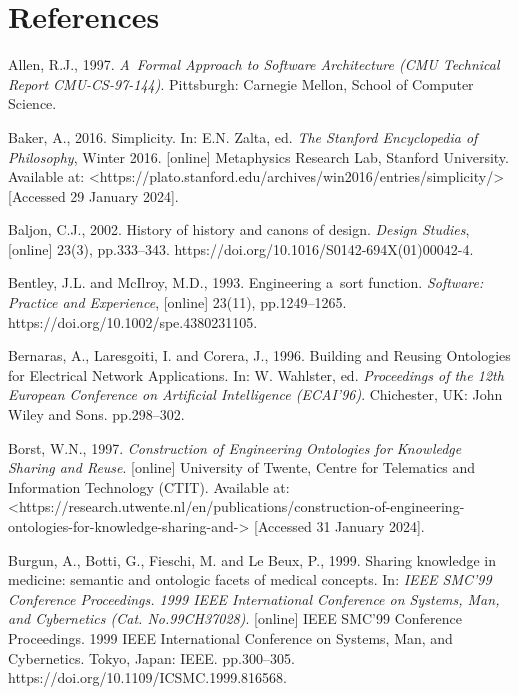 \section{References}

Allen, R.J., 1997. \textit{A~Formal Approach to Software Architecture (CMU Technical Report CMU-CS-97-144)}. Pittsburgh: Carnegie Mellon, School of Computer Science.



Baker, A., 2016. Simplicity. In: E.N. Zalta, ed. \textit{The Stanford Encyclopedia of Philosophy}, Winter 2016. [online] Metaphysics Research Lab, Stanford University. Available at: {\textless}https://plato.stanford.edu/archives/win2016/entries/simplicity/{\textgreater} [Accessed 29 January 2024].



Baljon, C.J., 2002. History of history and canons of design. \textit{Design Studies}, [online] 23(3), pp.333–343. https://doi.org/10.1016/S0142-694X(01)00042-4.



Bentley, J.L. and McIlroy, M.D., 1993. Engineering a~sort function. \textit{Software: Practice and Experience}, [online] 23(11), pp.1249–1265. https://doi.org/10.1002/spe.4380231105.



Bernaras, A., Laresgoiti, I. and Corera, J., 1996. Building and Reusing Ontologies for Electrical Network Applications. In: W. Wahlster, ed. \textit{Proceedings of the 12th European Conference on Artificial Intelligence (ECAI'96)}. Chichester, UK: John Wiley and Sons. pp.298–302.



Borst, W.N., 1997. \textit{Construction of Engineering Ontologies for Knowledge Sharing and Reuse}. [online] University of Twente, Centre for Telematics and Information Technology (CTIT). Available at: {\textless}https://research.utwente.nl/en/publications/construction-of-engineering-ontologies-for-knowledge-sharing-and-{\textgreater} [Accessed 31 January 2024].



Burgun, A., Botti, G., Fieschi, M. and Le Beux, P., 1999. Sharing knowledge in medicine: semantic and ontologic facets of medical concepts. In: \textit{IEEE SMC'99 Conference Proceedings. 1999 IEEE International Conference on Systems, Man, and Cybernetics (Cat. No.99CH37028)}. [online] IEEE SMC'99 Conference Proceedings. 1999 IEEE International Conference on Systems, Man, and Cybernetics. Tokyo, Japan: IEEE. pp.300–305. https://doi.org/10.1109/ICSMC.1999.816568.



